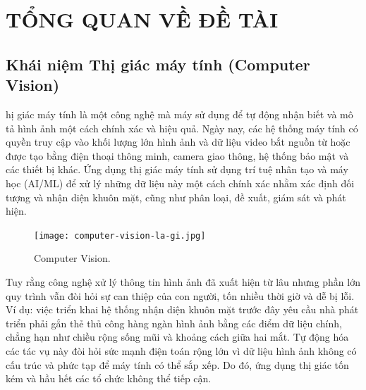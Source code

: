 
\chapter{TỔNG QUAN VỀ ĐỀ TÀI} 

\label{Chapter1} 


\newcommand{\keyword}[1]{\textbf{#1}}
\newcommand{\tabhead}[1]{\textbf{#1}}
\newcommand{\code}[1]{\texttt{#1}}
\newcommand{\file}[1]{\texttt{\bfseries#1}}
\newcommand{\option}[1]{\texttt{\itshape#1}}



\section{Khái niệm Thị giác máy tính (Computer Vision)}

hị giác máy tính là một công nghệ mà máy sử dụng để tự động nhận biết và mô tả hình ảnh một cách chính xác và hiệu quả. Ngày nay, các hệ thống máy tính có quyền truy cập vào khối lượng lớn hình ảnh và dữ liệu video bắt nguồn từ hoặc được tạo bằng điện thoại thông minh, camera giao thông, hệ thống bảo mật và các thiết bị khác. Ứng dụng thị giác máy tính sử dụng trí tuệ nhân tạo và máy học (AI/ML) để xử lý những dữ liệu này một cách chính xác nhằm xác định đối tượng và nhận diện khuôn mặt, cũng như phân loại, đề xuất, giám sát và phát hiện.

\begin{figure}[h!]
	\centering
	\texttt{[image: computer-vision-la-gi.jpg]}
	\caption[Computer Vision.]{Computer Vision.}
	\label{fig:ML}
\end{figure} 

Tuy rằng công nghệ xử lý thông tin hình ảnh đã xuất hiện từ lâu nhưng phần lớn quy trình vẫn đòi hỏi sự can thiệp của con người, tốn nhiều thời giờ và dễ bị lỗi. Ví dụ: việc triển khai hệ thống nhận diện khuôn mặt trước đây yêu cầu nhà phát triển phải gắn thẻ thủ công hàng ngàn hình ảnh bằng các điểm dữ liệu chính, chẳng hạn như chiều rộng sống mũi và khoảng cách giữa hai mắt. Tự động hóa các tác vụ này đòi hỏi sức mạnh điện toán rộng lớn vì dữ liệu hình ảnh không có cấu trúc và phức tạp để máy tính có thể sắp xếp. Do đó, ứng dụng thị giác tốn kém và hầu hết các tổ chức không thể tiếp cận.

